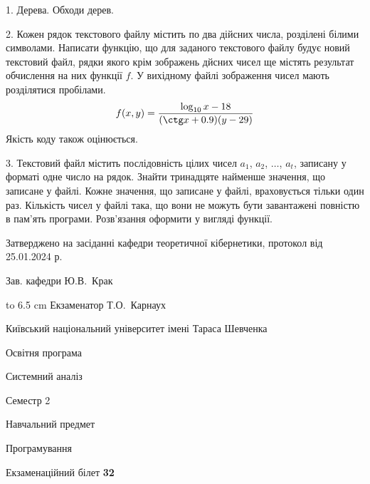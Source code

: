 \documentclass[12pt, ukrainian]{article}
\begin{document}
{%
1. Дерева. Обходи дерев.%
\par
\vspace{2mm}

2. Кожен рядок текстового файлу містить по два дійсних числа, розділені білими символами.
Написати функцію, що для заданого текстового файлу будує новий текстовий файл, рядки якого крім зображень дйсних чисел ще містять результат обчислення на них функції $f$. У вихідному файлі зображення чисел мають розділятися пробілами. 
$$f(x, y) =\frac{\log_{10} x - 18}{(\ctg x + 0.9) (y - 29)}$$ 
Якість коду також оцінюється.

\par
\vspace{2mm}

3. Текстовий файл містить послідовність цілих чисел $a_1$, $a_2$, $\ldots$, $a_t$, записану у форматі одне число на рядок. Знайти тринадцяте найменше значення, що записане у файлі. Кожне значення, що записане у файлі, враховується тільки один раз. Кількість чисел у файлі така, що вони не можуть бути завантажені повністю в пам'ять програми. Розв'язання оформити у вигляді функції.

}
{\smallskip\smallskip \begin {scriptsize} Затверджено на засіданні кафедри теоретичної кібернетики, протокол   від   25.01.2024 р.\par\smallskip\smallskip\smallskip\smallskip
{\parbox {6.5 cm} {Зав. кафедри \dotfill Ю.В.~Крак}}\hspace {0.7cm} {\hbox to 6.5 cm { Екзаменатор \dotfill Т.О.~Карнаух}} \end{scriptsize}}
\vspace{0.9cm}
{{\begin {scriptsize}\par
{ \center  Київський національний університет імені Тараса Шевченка \par}
{\parbox {5 cm}{Освітня програма \hfill}{\parbox {7 cm}{Системний аналіз\hfill}}\parbox {6 cm}{\hfill Семестр 2}}\par
{\parbox {5 cm} {Навчальний предмет \hfill}\parbox {7 cm}{Програмування \hfill}\parbox {6cm}{\hfill}\par}\vspace{-15pt} \end{scriptsize}}{\center Екзаменаційний білет \No \textbf { 32 }\par}}
\end{document}
